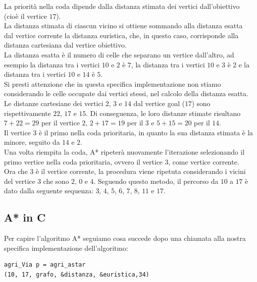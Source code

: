 \documentclass[8pt]{book}
\begin{document}
La priorità nella coda dipende dalla distanza stimata dei vertici dall'obiettivo (cioè il vertice $17$).\\
La distanza stimata di ciascun vicino si ottiene sommando alla distanza esatta dal vertice corrente la distanza euristica, che, in questo caso, corrisponde alla distanza cartesiana dal vertice obiettivo.\\
La distanza esatta è il numero di celle che separano un vertice dall'altro, ad esempio la distanza tra i vertici $10$ e $2$ è $7$, la distanza tra i vertici $10$ e $3$ è $2$ e la distanza tra i vertici $10$ e $14$ è $5$.\\
Si presti attenzione che in questa specifica implementazione non stiamo considerando le celle occupate dai vertici stessi, nel calcolo della distanza esatta.\\
Le distanze cartesiane dei vertici $2$, $3$ e $14$ dal vertice goal ($17$) sono rispettivamente $22$, $17$ e $15$. Di conseguenza, le loro distanze stimate risultano $7+22=29$ per il vertice $2$, $2+17=19$ per il $3$ e $5+15=20$ per il $14$.\\
Il vertice $3$ è il primo nella coda prioritaria, in quanto la sua distanza stimata è la minore, seguito da $14$ e $2$.\\
Una volta riempita la coda, A* ripeterà nuovamente l'iterazione selezionando il primo vertice nella coda prioritaria, ovvero il vertice $3$, come vertice corrente.\\
Ora che $3$ è il vertice corrente, la procedura viene ripetuta considerando i vicini del vertice $3$ che sono $2$, $0$ e $4$. Seguendo questo metodo, il percorso da $10$ a $17$ è dato dalla seguente sequenza: $3$, $4$, $5$, $6$, $7$, $8$, $11$ e $17$.

\subsection{A* in C}

Per capire l'algoritmo A* seguiamo cosa succede dopo una chiamata alla nostra specifica implementazione dell'algoritmo:

\begin{spacing}{0.9}
  \begin{small}
\begin{tcolorbox}
\begin{verbatim}
agri_Via p = agri_astar
(10, 17, grafo, &distanza, &euristica,34)
\end{verbatim}
    \end{tcolorbox}
  \end{small}
\end{spacing}
\end{document}
